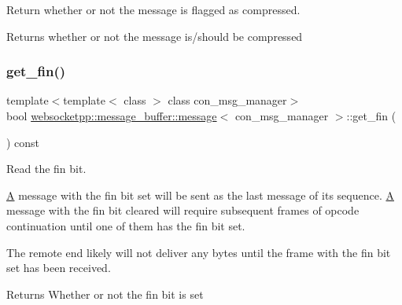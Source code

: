 Return whether or not the message is flagged as compressed. 

\begin{DoxyReturn}{Returns}
whether or not the message is/should be compressed 
\end{DoxyReturn}
\mbox{\label{classwebsocketpp_1_1message__buffer_1_1message_a8546e56c8a4c6d7f9f37510183874fba}} 
\subsubsection{\texorpdfstring{get\+\_\+fin()}{get\_fin()}}
{\footnotesize\ttfamily template$<$template$<$ class $>$ class con\+\_\+msg\+\_\+manager$>$ \\
bool \mbox{\hyperlink{classwebsocketpp_1_1message__buffer_1_1message}{websocketpp\+::message\+\_\+buffer\+::message}}$<$ con\+\_\+msg\+\_\+manager $>$\+::get\+\_\+fin (\begin{DoxyParamCaption}{ }\end{DoxyParamCaption}) const\hspace{0.3cm}{\ttfamily [inline]}}



Read the fin bit. 

\mbox{\hyperlink{struct_a}{A}} message with the fin bit set will be sent as the last message of its sequence. \mbox{\hyperlink{struct_a}{A}} message with the fin bit cleared will require subsequent frames of opcode continuation until one of them has the fin bit set.

The remote end likely will not deliver any bytes until the frame with the fin bit set has been received.

\begin{DoxyReturn}{Returns}
Whether or not the fin bit is set 
\end{DoxyReturn}
\mbox{\label{classwebsocketpp_1_1message__buffer_1_1message_a020b849ba700f5fefebb2f461a97505e}} 
